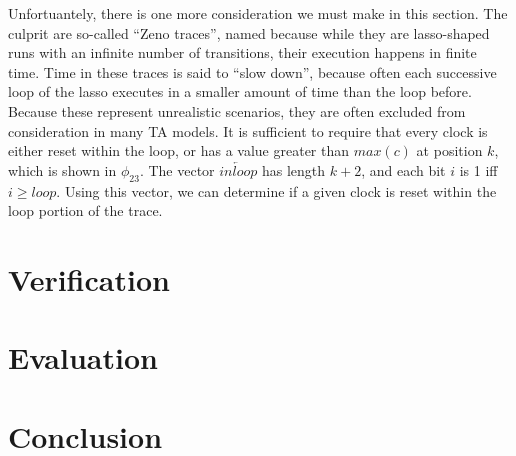 \documentclass[a4paper,12pt]{article}
\begin{document}
Unfortuantely, there is one more consideration we must make in this section. The
culprit are so-called ``Zeno traces'', named because while they are lasso-shaped
runs with an infinite number of transitions, their execution happens in finite
time. Time in these traces is said to ``slow down'', because often each successive
loop of the lasso executes in a smaller amount of time than the loop before.
Because these represent unrealistic scenarios, they are often excluded from
consideration in many TA models. It is sufficient to require that every clock is
either reset within the loop, or has a value greater than \(max(c)\) at position
\(k\), which is shown in \(\phi_{23}\). The vector \(\overleftarrow{inloop}\)
has length \(k+2\), and each bit \(i\) is 1 iff \(i \geq loop\). Using this
vector, we can determine if a given clock is reset within the loop portion of
the trace.


\section{Verification}
\label{sec:org43ea564}
\section{Evaluation}
\label{sec:orgf5e18e9}
\section{Conclusion}
\label{sec:org695ca5c}
\end{document}
